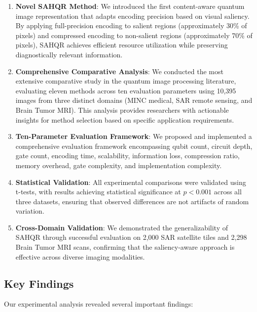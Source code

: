 \documentclass{ipol}
\begin{document}
\begin{enumerate}
\item \textbf{Novel SAHQR Method}: We introduced the first content-aware quantum image representation that adapts encoding precision based on visual saliency. By applying full-precision encoding to salient regions (approximately 30\% of pixels) and compressed encoding to non-salient regions (approximately 70\% of pixels), SAHQR achieves efficient resource utilization while preserving diagnostically relevant information.

\item \textbf{Comprehensive Comparative Analysis}: We conducted the most extensive comparative study in the quantum image processing literature, evaluating eleven methods across ten evaluation parameters using 10,395 images from three distinct domains (MINC medical, SAR remote sensing, and Brain Tumor MRI). This analysis provides researchers with actionable insights for method selection based on specific application requirements.

\item \textbf{Ten-Parameter Evaluation Framework}: We proposed and implemented a comprehensive evaluation framework encompassing qubit count, circuit depth, gate count, encoding time, scalability, information loss, compression ratio, memory overhead, gate complexity, and implementation complexity.

\item \textbf{Statistical Validation}: All experimental comparisons were validated using t-tests, with results achieving statistical significance at $p < 0.001$ across all three datasets, ensuring that observed differences are not artifacts of random variation.

\item \textbf{Cross-Domain Validation}: We demonstrated the generalizability of SAHQR through successful evaluation on 2,000 SAR satellite tiles and 2,298 Brain Tumor MRI scans, confirming that the saliency-aware approach is effective across diverse imaging modalities.
\end{enumerate}

\subsection{Key Findings}

Our experimental analysis revealed several important findings:
\end{document}
